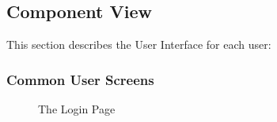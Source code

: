 \documentclass[11pt]{article}
\begin{document}
\subsection{Component View}
This section describes the User Interface for each user:

\subsubsection{Common User Screens}
\begin{figure}[H]
	\caption{The Login Page}
\end{figure}
\end{document}
